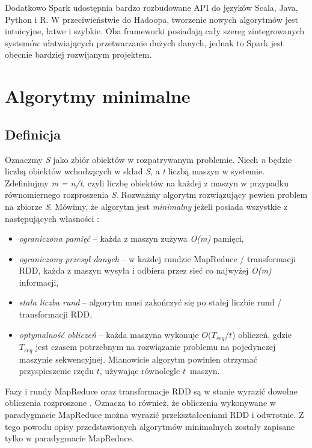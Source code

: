 \documentclass[magisterska]{pracamgr}
\begin{document}
Dodatkowo Spark udostępnia bardzo rozbudowane API do języków Scala, Java, Python i R. W przeciwieństwie do Hadoopa, tworzenie nowych algorytmów jest intuicyjne, łatwe i szybkie. Oba frameworki posiadają cały szereg zintegrowanych systemów ułatwiających przetwarzanie dużych danych, jednak to Spark jest obecnie bardziej rozwijanym projektem.

\chapter{Algorytmy minimalne}\label{algorytmy_minimalne}
\section{Definicja}

Oznaczmy \textit{S} jako zbiór obiektów w rozpatrywanym problemie. Niech \textit{n} będzie liczbą obiektów wchodzących w skład \textit{S}, a \textit{t} liczbą maszyn w systemie. Zdefiniujmy \textit{m = n/t}, czyli liczbę obiektów na każdej z maszyn w przypadku równomiernego rozproszenia \textit{S}. Rozważmy algorytm rozwiązujący pewien problem na zbiorze \textit{S}. Mówimy, że algorytm jest \textit{minimalny} jeżeli posiada wszystkie z następujących własności \cite{tao2013minimal}:
\begin{itemize}
    \item \textit{ograniczona pamięć} -- każda z maszyn zużywa \textit{O(m)} pamięci,
    \item \textit{ograniczony przesył danych} -- w każdej rundzie MapReduce / transformacji RDD, każda z maszyn wysyła i odbiera przez sieć co najwyżej \textit{O(m)} informacji,
    \item \textit{stała liczba rund} -- algorytm musi zakończyć się po stałej liczbie rund / transformacji RDD,
    \item \textit{optymalność obliczeń} -- każda maszyna wykonuje \(O(T_{seq} / t\)) obliczeń, gdzie \(T_{seq}\) jest czasem potrzebnym na rozwiązanie problemu na pojedynczej maszynie sekwencyjnej. Mianowicie algorytm powinien otrzymać przyspieszenie rzędu \(t\), używając równolegle \(t\)~maszyn.
\end{itemize}

Fazy i rundy MapReduce oraz transformacje RDD są w stanie wyrazić dowolne obliczenia rozproszone \cite{zaharia2016apache}. Oznacza to również, że obliczenia wykonywane w paradygmacie MapReduce można wyrazić przekształceniami RDD i odwrotnie. Z tego powodu opisy przedstawionych algorytmów minimalnych zostały zapisane tylko w paradygmacie MapReduce.
\end{document}
